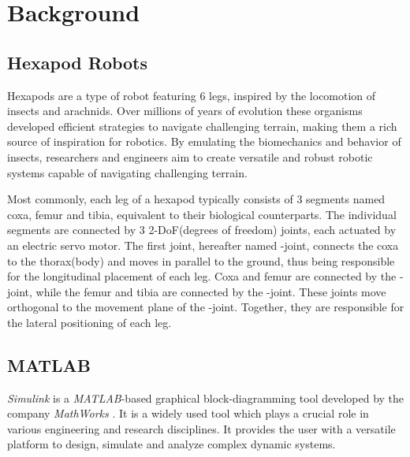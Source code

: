 \chapter{Background}
\label{ch:background}

\section{Hexapod Robots}
Hexapods are a type of robot featuring 6 legs, inspired by the locomotion of insects and arachnids.
Over millions of years of evolution these organisms developed efficient strategies to navigate challenging terrain, making them a rich source of inspiration for robotics.
By emulating the biomechanics and behavior of insects, researchers and engineers aim to create versatile and robust robotic systems capable of navigating challenging terrain.

Most commonly, each leg of a hexapod typically consists of 3 segments named coxa, femur and tibia, equivalent to their biological counterparts.
The individual segments are connected by 3 2-DoF(degrees of freedom) joints, each actuated by an electric servo motor.
The first joint, hereafter named \textalpha-joint, connects the coxa to the thorax(body) and moves in parallel to the ground, thus being responsible for the longitudinal placement of each leg.
Coxa and femur are connected by the \textbeta-joint, while the femur and tibia are connected by the \textgamma-joint. 
These joints move orthogonal to the movement plane of the \textalpha-joint. Together, they are responsible for the lateral positioning of each leg.





\section{MATLAB}
\textit{Simulink\textsuperscript{\textregistered}} is a \textit{MATLAB\textsuperscript{\textregistered}}-based graphical block-diagramming tool developed by the company \textit{MathWorks\textsuperscript{\textregistered}} .
It is a widely used tool which plays a crucial role in various engineering and research disciplines.
It provides the user with a versatile platform to design, simulate and analyze complex dynamic systems.

